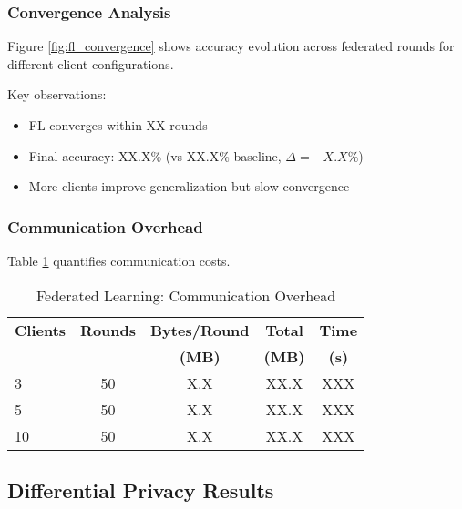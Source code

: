 \documentclass[conference]{IEEEtran}
\begin{document}
\subsubsection{Convergence Analysis}

Figure \ref{fig:fl_convergence} shows accuracy evolution across federated rounds for different client configurations.


Key observations:
\begin{itemize}
    \item FL converges within XX rounds
    \item Final accuracy: XX.X\% (vs XX.X\% baseline, $\Delta = -X.X\%$)
    \item More clients improve generalization but slow convergence
\end{itemize}

\subsubsection{Communication Overhead}

Table \ref{tab:fl_overhead} quantifies communication costs.

\begin{table}[htbp]
\centering
\caption{Federated Learning: Communication Overhead}
\label{tab:fl_overhead}
\begin{tabular}{@{}lcccc@{}}
\toprule
\textbf{Clients} & \textbf{Rounds} & \textbf{Bytes/Round} & \textbf{Total} & \textbf{Time} \\
 & & \textbf{(MB)} & \textbf{(MB)} & \textbf{(s)} \\ \midrule
3  & 50 & X.X & XX.X & XXX \\
5  & 50 & X.X & XX.X & XXX \\
10 & 50 & X.X & XX.X & XXX \\ \bottomrule
\end{tabular}
\end{table}

\subsection{Differential Privacy Results}
\end{document}
